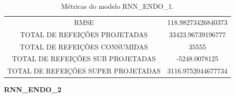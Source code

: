 \documentclass[	12pt, Times, openright, twoside, a4paper, english, brazil]{abntex2}
\begin{document}
                \begin{table}[!ht]
                   \centering
                   \caption{Métricas do modelo RNN\_ENDO\_1.}
                \begin{tabular}{|c|c|}
                \rowcolor{gray!50} \hline
                \multicolumn{2}{c}{ METRICAS DO MODELO RNN\_ENDO\_1 : }\\ \hline
                RMSE & 118.98273426840373\\
                TOTAL DE REFEIÇÕES PROJETADAS & 33423.96739196777\\
                TOTAL DE REFEIÇÕES CONSUMIDAS & 35555\\
                TOTAL DE REFEIÇÕES SUB PROJETADAS & -5248.0078125\\
                TOTAL DE REFEIÇÕES SUPER PROJETADAS & 3116.9752044677734\\
                \hline
                \end{tabular}\end{table}

             {\textbf{RNN\_ENDO\_2}}
                \begin{figure}[H]
                \end{figure}
\end{document}
